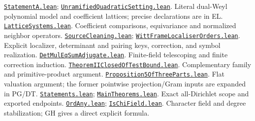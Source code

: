 \documentclass[11pt,a4paper]{article}
\numberwithin{equation}{section}
\theoremstyle{remark}\newtheorem{remark}[theorem]{Remark}
\newcommand{\src}[2]{\href{https://github.com/CocoSgt/riemann-hypothesis-lean/blob/7cbf7a0c32fca1badf05931879a37c3f8a2b03b4/src/#1}{\texttt{#2}}}
\begin{document}
\begin{thebibliography}{99}
 \src{Formalism/GradedWeylDivisibility/StatementA.lean}{StatementA.lean}; \src{Formalism/SharpRestriction/GrowthBounds/UnramifiedQuadraticSetting.lean}{UnramifiedQuadraticSetting.lean}. Literal dual-Weyl polynomial model and coefficient lattices; precise declarations are in EL.
 \src{Formalism/SharpRestriction/GrowthBounds/LatticeSystems.lean}{LatticeSystems.lean}. Coefficient comparisons, equivariance and normalized neighbor operators.
 \src{Formalism/SharpRestriction/GrowthBounds/SourceCleaning.lean}{SourceCleaning.lean}; \src{Formalism/SharpRestriction/GrowthBounds/WittFrameLocaliserOrders.lean}{WittFrameLocaliserOrders.lean}. Explicit localizer, determinant and pairing keys, correction, and symbol realization.
 \src{Formalism/PolynomialDimension/DetMulEqSumAdjugate.lean}{DetMulEqSumAdjugate.lean}. Finite-field telescoping and finite correction induction.
 \src{Formalism/SharpRestriction/GrowthBounds/DualFockLinear/TheoremIIClosedOfTestBound.lean}{TheoremIIClosedOfTestBound.lean}. Complementary family and primitive-product argument.
 \src{Formalism/SharpRestriction/GrowthBounds/DiagonalSupport/Proposition5OfThreeParts.lean}{Proposition5OfThreeParts.lean}. Flat valuation argument; the former pointwise projection/Gram inputs are expanded in PG/DT.
 \src{Statements.lean}{Statements.lean}; \src{Supplements/Kernels/MainTheorems.lean}{MainTheorems.lean}. Exact all-Dirichlet scope and exported endpoints.
 \src{Development/AutomorphicArithmetic/CharacterBoxes/OrdAny.lean}{OrdAny.lean}; \src{Development/AutomorphicArithmetic/CharacterBoxes/IsChiField.lean}{IsChiField.lean}. Character field and degree stabilization; GH gives a direct explicit formula.


\end{thebibliography}
\end{document}

